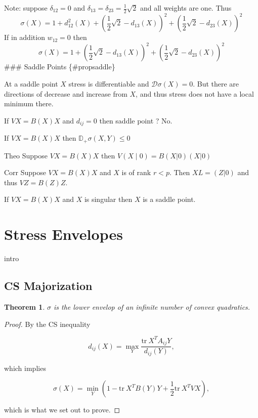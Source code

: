 \documentclass[
  12pt,
]{book}
\newtheorem{theorem}{Theorem}[chapter]
\theoremstyle{definition}
\theoremstyle{definition}
\theoremstyle{definition}
\theoremstyle{definition}
\theoremstyle{remark}
\begin{document}
Note: suppose
\(\delta_{12}=0\) and \(\delta_{13}=\delta_{23}=\frac12\sqrt{2}\) and all weights are one. Thus
\[
\sigma(X)=1+d_{12}^2(X)+(\frac12\sqrt{2}-d_{13}(X))^2+(\frac12\sqrt{2}-d_{23}(X))^2
\]
If in addition \(w_{12}=0\) then
\[
\sigma(X)=1+(\frac12\sqrt{2}-d_{13}(X))^2+(\frac12\sqrt{2}-d_{23}(X))^2
\]
\#\#\# Saddle Points \{\#propsaddle\}

At a saddle point \(X\) stress is differentiable and \(\mathcal{D}\sigma(X)=0\). But there are directions of decrease and increase from \(X\), and thus stress does not have a local minimum there.

If \(VX=B(X)X\) and \(d_{ij}=0\) then saddle point ? No.

If \(VX=B(X)X\) then \(\mathbb{D}_+\sigma(X,Y)\leq 0\)

Theo Suppose \(VX=B(X)X\) then \(V(X\mid 0)=B(X|0)(X|0)\)

Corr Suppose \(VX=B(X)X\) and \(X\) is of rank \(r<p\). Then \(XL=(Z|0)\) and thus \(VZ=B(Z)Z\).

If \(VX=B(X)X\) and \(X\) is singular then \(X\) is a saddle point.

\hypertarget{propenvelopes}{%
\section{Stress Envelopes}\label{propenvelopes}}

intro

\hypertarget{propcsmaj}{%
\subsection{CS Majorization}\label{propcsmaj}}

\begin{theorem}
\protect\hypertarget{thm:proplowenv}{}{\label{thm:proplowenv} }\(\sigma\) is the lower envelop of an infinite number of convex quadratics.
\end{theorem}

\begin{proof}
By the CS inequality

\begin{equation}
d_{ij}(X)=\max_Y \frac{\text{tr}\ X^TA_{ij}Y}{d_{ij}(Y)},
\label{eq:dasmax}
\end{equation}

which implies

\begin{equation}
\sigma(X)=\min_Y\left(1-\text{tr}\ X^TB(Y)Y+\frac12\text{tr}\ X^TVX\right),
\label{eq:sigasmin}
\end{equation}

which is what we set out to prove.
\end{proof}
\end{document}
